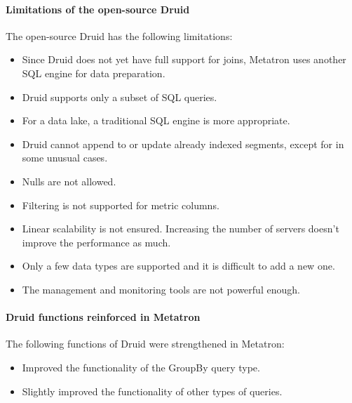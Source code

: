 \documentclass[letterpaper,10pt,english]{sphinxmanual}
\begin{document}
\paragraph{Limitations of the open-source Druid}
\label{\detokenize{discovery/part01/druid_to_metatron:id4}}
The open-source Druid has the following limitations:
\begin{itemize}
\item {} 
Since Druid does not yet have full support for joins, Metatron uses another SQL engine for data preparation.

\item {} 
Druid supports only a subset of SQL queries.

\item {} 
For a data lake, a traditional SQL engine is more appropriate.

\item {} 
Druid cannot append to or update already indexed segments, except for in some unusual cases.

\item {} 
Nulls are not allowed.

\item {} 
Filtering is not supported for metric columns.

\item {} 
Linear scalability is not ensured. Increasing the number of servers doesn’t improve the performance as much.

\item {} 
Only a few data types are supported and it is difficult to add a new one.

\item {} 
The management and monitoring tools are not powerful enough.

\end{itemize}


\paragraph{Druid functions reinforced in Metatron}
\label{\detokenize{discovery/part01/druid_to_metatron:id5}}
The following functions of Druid were strengthened in Metatron:

\begin{itemize}
\item {} 
Improved the functionality of the GroupBy query type.

\item {} 
Slightly improved the functionality of other types of queries.

\end{itemize}
\end{document}
